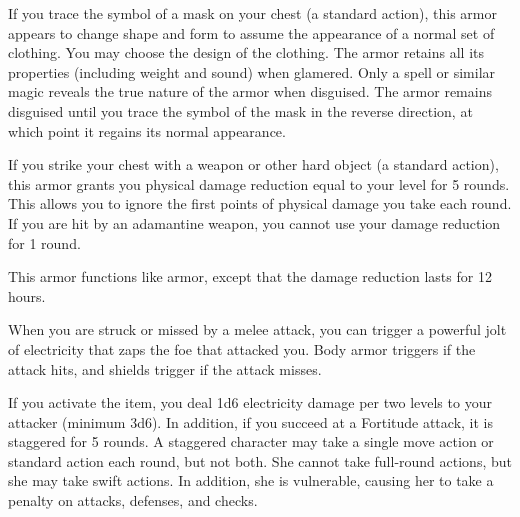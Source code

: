 
 If you trace the symbol of a mask on your chest (a standard action), this armor appears to change shape and form to assume the appearance of a normal set of clothing. You may choose the design of the clothing. The armor retains all its properties (including weight and sound) when glamered. Only a  spell or similar magic reveals the true nature of the armor when disguised. The armor remains disguised until you trace the symbol of the mask in the reverse direction, at which point it regains its normal appearance. 


 If you strike your chest with a weapon or other hard object (a standard action), this armor grants you physical damage reduction equal to your level for 5 rounds. This allows you to ignore the first points of physical damage you take each round. If you are hit by an adamantine weapon, you cannot use your damage reduction for 1 round.


 This armor functions like  armor, except that the damage reduction lasts for 12 hours.


 When you are struck or missed by a melee attack, you can trigger a powerful jolt of electricity that zaps the foe that attacked you. Body armor triggers if the attack hits, and shields trigger if the attack misses.

If you activate the item, you deal 1d6 electricity damage per two levels to your attacker (minimum 3d6). In addition, if you succeed at a Fortitude attack, it is staggered for 5 rounds. A staggered character may take a single move action or standard action each round, but not both. She cannot take full-round actions, but she may take swift actions. In addition, she is vulnerable, causing her to take a  penalty on attacks, defenses, and checks.

